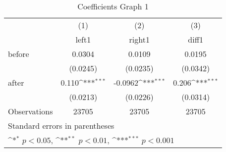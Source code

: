 \begin{table}[htbp]\centering \footnotesize
\def\sym#1{\ifmmode^{#1}\else\(^{#1}\)\fi}
\caption{Coefficients Graph 1}
\begin{tabular}{l*{3}{c}}
\hline\hline
                    &\multicolumn{1}{c}{(1)}&\multicolumn{1}{c}{(2)}&\multicolumn{1}{c}{(3)}\\
                    &\multicolumn{1}{c}{left1}&\multicolumn{1}{c}{right1}&\multicolumn{1}{c}{diff1}\\
\hline
before              &      0.0304         &      0.0109         &      0.0195         \\
                    &    (0.0245)         &    (0.0235)         &    (0.0342)         \\
[1em]
after               &       0.110\sym{***}&     -0.0962\sym{***}&       0.206\sym{***}\\
                    &    (0.0213)         &    (0.0226)         &    (0.0314)         \\
\hline
Observations        &       23705         &       23705         &       23705         \\
\hline\hline
\multicolumn{4}{l}{\footnotesize Standard errors in parentheses}\\
\multicolumn{4}{l}{\footnotesize \sym{*} \(p<0.05\), \sym{**} \(p<0.01\), \sym{***} \(p<0.001\)}\\
\end{tabular}
\end{table}
